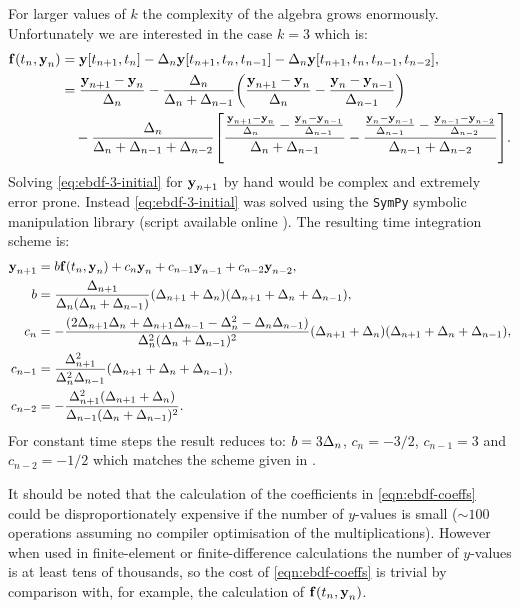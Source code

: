 For larger values of $k$ the complexity of the algebra grows enormously.
Unfortunately we are interested in the case $k=3$ which is:
\begin{equation}
  \begin{aligned}
    {\boldsymbol{\mathrm{f}}}(t_n, \boldsymbol{\mathrm{y}}_n) &= \boldsymbol{\mathrm{y}}[t_{n+1}, t_n] - \Delta_{n} \boldsymbol{\mathrm{y}}[t_{n+1}, t_n, t_{n-1}] -\Delta_{n} \boldsymbol{\mathrm{y}}[t_{n+1}, t_n, t_{n-1}, t_{n-2}], \\
    &=  \frac{\boldsymbol{\mathrm{y}}_{n+1} - \boldsymbol{\mathrm{y}}_n}{\Delta_{n}}
    - \frac{\Delta_{n}}{\Delta_{n} + \Delta_{n-1}} {\left(  \frac{\boldsymbol{\mathrm{y}}_{n+1} - \boldsymbol{\mathrm{y}}_n}{\Delta_{n}} - \frac{\boldsymbol{\mathrm{y}}_n - \boldsymbol{\mathrm{y}}_{n-1}}{\Delta_{n-1}} \right)} \\
    &\quad - \frac{\Delta_{n}}{\Delta_{n} + \Delta_{n-1} + \Delta_{n-2}}
         {\left[ 
           \frac{\frac{\boldsymbol{\mathrm{y}}_{n+1} - \boldsymbol{\mathrm{y}}_n}{\Delta_{n}} - \frac{\boldsymbol{\mathrm{y}}_n - \boldsymbol{\mathrm{y}}_{n-1}}{\Delta_{n-1}}}
                {\Delta_{n} +\Delta_{n-1}}
           -
           \frac{\frac{\boldsymbol{\mathrm{y}}_{n} - \boldsymbol{\mathrm{y}}_{n-1}}{\Delta_{n-1}} - \frac{\boldsymbol{\mathrm{y}}_{n-1} - \boldsymbol{\mathrm{y}}_{n-2}}{\Delta_{n-2}}}
                {\Delta_{n-1} +\Delta_{n-2}}
          \right]}.
  \end{aligned}
  \label{eq:ebdf-3-initial}
\end{equation}
Solving \cref{eq:ebdf-3-initial} for $\boldsymbol{\mathrm{y}}_{n+1}$ by hand would be complex and extremely error prone.
Instead \cref{eq:ebdf-3-initial} was solved using the \texttt{SymPy} symbolic manipulation library \cite{sympy} (script available online \cite{??ds ebdf3-sympy-script}).
The resulting time integration scheme is:
\begin{equation}
  \label{eqn:ebdf-coeffs}
  \begin{aligned}
    \boldsymbol{\mathrm{y}}_{n+1} &= b {\boldsymbol{\mathrm{f}}}(t_n, \boldsymbol{\mathrm{y}}_n) + c_n \boldsymbol{\mathrm{y}}_n + c_{n-1} \boldsymbol{\mathrm{y}}_{n-1} + c_{n-2} \boldsymbol{\mathrm{y}}_{n-2}, \\
    b &= \frac{\Delta_{n+1}}{\Delta_{n} (\Delta_{n} + \Delta_{n-1})} (\Delta_{n+1} + \Delta_{n}) (\Delta_{n+1} + \Delta_{n} + \Delta_{n-1}) ,\\
    c_n &= - \frac{ (2 \Delta_{n+1} \Delta_{n} + \Delta_{n+1} \Delta_{n-1} - \Delta_{n}^{2} - \Delta_{n} \Delta_{n-1}) }{\Delta_{n}^{2} (\Delta_{n} + \Delta_{n-1})^{2}} (\Delta_{n+1} + \Delta_{n}) (\Delta_{n+1} + \Delta_{n} + \Delta_{n-1}),\\
    c_{n-1} &= \frac{\Delta_{n+1}^{2}}{\Delta_{n}^{2} \Delta_{n-1}} (\Delta_{n+1} + \Delta_{n} + \Delta_{n-1}) ,\\
    c_{n-2} &= - \frac{\Delta_{n+1}^{2} (\Delta_{n+1} + \Delta_{n})}{\Delta_{n-1} (\Delta_{n} + \Delta_{n-1})^{2}}.
  \end{aligned}
\end{equation}
For constant time steps the result reduces to: $ b = 3\Delta_{n}$, $c_n = -3/2$, $c_{n-1} = 3$ and  $c_{n-2} = -1/2$ which matches the scheme given in \cite[364]{HairerNorsettWanner}.

It should be noted that the calculation of the coefficients in \cref{eqn:ebdf-coeffs} could be disproportionately expensive if the number of $y$-values is small ($\sim 100$ operations assuming no compiler optimisation of the multiplications).
However when used in finite-element or finite-difference calculations the number of $y$-values is at least tens of thousands, so the cost of \cref{eqn:ebdf-coeffs} is trivial by comparison with, for example, the calculation of ${\boldsymbol{\mathrm{f}}{\left( t_n, \boldsymbol{\mathrm{y}}_n \right)}}$.


